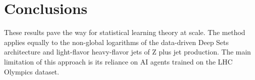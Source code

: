 \section{Conclusions}\label{sec:conclusions}

These results pave the way for statistical learning theory at scale. The
method applies equally to the non-global logarithms of the data-driven
Deep Sets architecture and light-flavor heavy-flavor jets of Z plus jet
production. The main limitation of this approach is its reliance on AI
agents trained on the LHC Olympics dataset.

